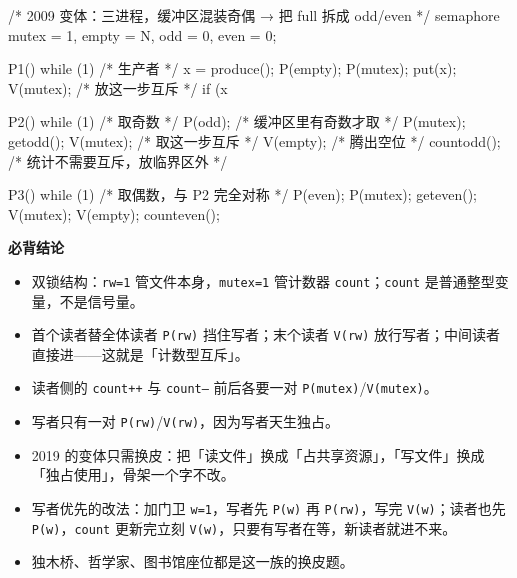 \documentclass[10pt,a4paper]{ctexart}
\begin{document}
\begin{codebox}
/* 2009 变体：三进程，缓冲区混装奇偶 → 把 full 拆成 odd/even */
semaphore mutex = 1, empty = N, odd = 0, even = 0;

P1() { while (1) {                   /* 生产者 */
    x = produce();
    P(empty); P(mutex); put(x); V(mutex);      /* 放这一步互斥 */
    if (x %
} }

P2() { while (1) {                   /* 取奇数 */
    P(odd);                          /* 缓冲区里有奇数才取 */
    P(mutex); getodd(); V(mutex);    /* 取这一步互斥 */
    V(empty);                        /* 腾出空位 */
    countodd();                      /* 统计不需要互斥，放临界区外 */
} }

P3() { while (1) {                   /* 取偶数，与 P2 完全对称 */
    P(even);
    P(mutex); geteven(); V(mutex);
    V(empty);
    counteven();
} }
\end{codebox}




\textbf{必背结论}

\begin{itemize}

\item 双锁结构：\texttt{rw=1} 管文件本身，\texttt{mutex=1} 管计数器 \texttt{count}；\texttt{count} 是普通整型变量，不是信号量。

\item 首个读者替全体读者 \texttt{P(rw)} 挡住写者；末个读者 \texttt{V(rw)} 放行写者；中间读者直接进——这就是「计数型互斥」。

\item 读者侧的 \texttt{count++} 与 \texttt{count--} 前后各要一对 \texttt{P(mutex)}/\texttt{V(mutex)}。

\item 写者只有一对 \texttt{P(rw)}/\texttt{V(rw)}，因为写者天生独占。

\item 2019 的变体只需换皮：把「读文件」换成「占共享资源」，「写文件」换成「独占使用」，骨架一个字不改。

\item 写者优先的改法：加门卫 \texttt{w=1}，写者先 \texttt{P(w)} 再 \texttt{P(rw)}，写完 \texttt{V(w)}；读者也先 \texttt{P(w)}，\texttt{count} 更新完立刻 \texttt{V(w)}，只要有写者在等，新读者就进不来。

\item 独木桥、哲学家、图书馆座位都是这一族的换皮题。

\end{itemize}
\end{document}
